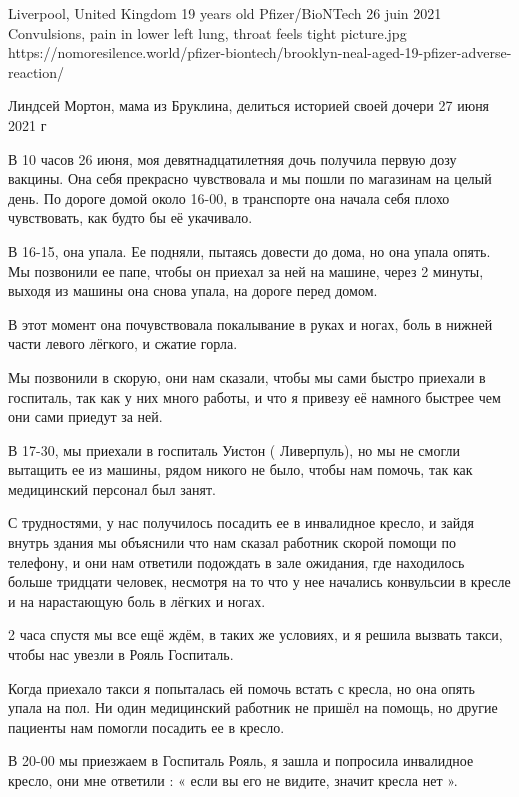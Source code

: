           {Liverpool, United Kingdom}
          {19 years old}
          {Pfizer/BioNTech}
          {26 juin 2021}
          {Convulsions, pain in lower left lung, throat feels tight
          }
          {picture.jpg}
          {https://nomoresilence.world/pfizer-biontech/brooklyn-neal-aged-19-pfizer-adverse-reaction/}
          {

\normalsize

Линдсей Мортон, мама из Бруклина, делиться историей своей дочери 27 июня 2021 г

В 10 часов 26 июня, моя девятнадцатилетняя дочь получила первую дозу
вакцины. Она себя прекрасно чувствовала и мы пошли по магазинам на целый
день. По дороге домой около 16-00, в транспорте она начала себя плохо
чувствовать, как будто бы её укачивало.

В 16-15, она упала. Ее подняли, пытаясь довести до дома, но она упала опять. Мы
позвонили ее папе, чтобы он приехал за ней на машине, через 2 минуты, выходя из
машины она снова упала, на дороге перед домом.

В этот момент она почувствовала покалывание в руках и ногах, боль в нижней части
левого лёгкого, и сжатие горла.

Мы позвонили в скорую, они нам сказали, чтобы мы сами быстро приехали в
госпиталь, так как у них много работы, и что я привезу её намного быстрее чем
они сами приедут за ней.

В 17-30, мы приехали в госпиталь Уистон ( Ливерпуль), но мы не смогли вытащить
ее из машины, рядом никого не было, чтобы нам помочь, так как медицинский
персонал был занят.

С трудностями, у нас получилось посадить ее в инвалидное кресло, и зайдя внутрь
здания мы объяснили что нам сказал работник скорой помощи по телефону, и они нам
ответили подождать в зале ожидания, где находилось больше тридцати человек,
несмотря на то что у нее начались конвульсии в кресле и на нарастающую боль в
лёгких и ногах.

2 часа спустя мы все ещё ждём, в таких же условиях, и я решила вызвать такси,
чтобы нас увезли в Рояль Госпиталь.

Когда приехало такси я попыталась ей помочь встать с кресла, но она опять упала
на пол. Ни один медицинский работник не пришёл на помощь, но другие пациенты нам
помогли посадить ее в кресло.

В 20-00 мы приезжаем в Госпиталь Рояль, я зашла и попросила инвалидное кресло,
они мне ответили : « если вы его не видите, значит кресла нет ».

}
